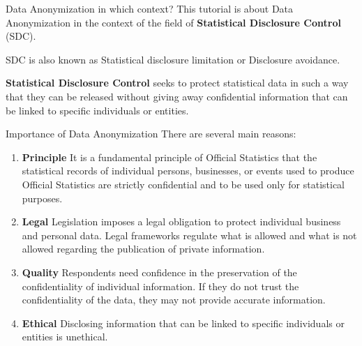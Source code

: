 \documentclass[
	11pt, %
]{beamer}
\begin{document}
\begin{frame}{Data Anonymization in which context?}
\label{data-anonymization-in-which-context}
This tutorial is about Data Anonymization in the context of the field of
\textbf{Statistical Disclosure Control} (SDC).

SDC is also known as Statistical disclosure limitation or Disclosure
avoidance.

\vspace{1cm}

\textbf{Statistical Disclosure Control} seeks to protect statistical
data in such a way that they can be released without giving away
confidential information that can be linked to specific individuals or
entities.
\end{frame}

\begin{frame}{Importance of Data Anonymization}
\label{importance-of-data-anonymization}
There are several main reasons:

\begin{enumerate}
\item
  \textbf{Principle} It is a fundamental principle of Official
  Statistics that the statistical records of individual persons,
  businesses, or events used to produce Official Statistics are strictly
  confidential and to be used only for statistical purposes.
\item
  \textbf{Legal} Legislation imposes a legal obligation to protect
  individual business and personal data. Legal frameworks regulate what
  is allowed and what is not allowed regarding the publication of
  private information.
\item
  \textbf{Quality} Respondents need confidence in the preservation of
  the confidentiality of individual information. If they do not trust
  the confidentiality of the data, they may not provide accurate
  information.
\item
  \textbf{Ethical} Disclosing information that can be linked to specific
  individuals or entities is unethical.
\end{enumerate}
\end{frame}
\end{document}
